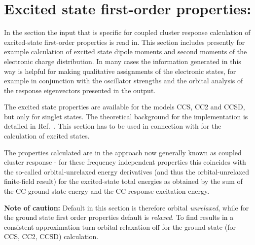 
\section{Excited state first-order properties: }\label{sec:ccexgr}

In the  section the input that is specific for coupled cluster 
response calculation of excited-state first-order properties is read in.
This section includes presently for example calculation of excited state 
dipole moments and second moments of the electronic charge distribution.
In many cases the information generated in this way is helpful 
for making qualitative assignments of the electronic states, for example
in conjunction with the oscillator strengths and the 
orbital analysis of the response eigenvectors presented in the output.

The excited state properties are available for the models CCS, CC2 and CCSD,
but only for singlet states.
The theoretical background for the implementation is detailed in Ref.\ \cite{Christiansen:CCLR,Christiansen:QEL}.
This section has to be used in connection with  for the calculation of excited states.

The properties calculated are in the approach now generally known as coupled cluster
response - for these frequency independent properties this coincides with the so-called
orbital-unrelaxed energy derivatives (and thus the orbital-unrelaxed finite-field result)
for the excited-state total energies as obtained by the sum of the CC ground state energy
and the CC response excitation energy.

{\bf Note of caution:}
Default in this section is therefore orbital {\it unrelaxed}, while for the ground state 
first order properties  default is {\it relaxed}. 
To find results in a consistent approximation turn orbital relaxation off
for the ground state (for CCS, CC2, CCSD) calculation.

\begin{center}
\end{center}

